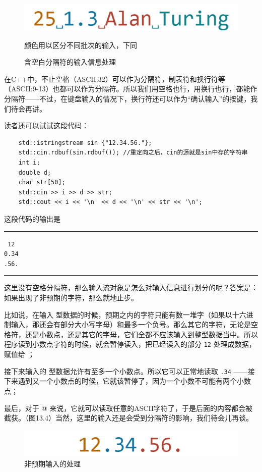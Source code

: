 \begin{figure}[htbp]
    \centering
    \includegraphics[width=.4\textwidth]{../images/generalized_parts/13_input_with_space_delimiter.drawio.png}
    \caption{含空白分隔符的输入信息处理}
    \footnotesize{颜色用以区分不同批次的输入，下同} 
\end{figure}
在C++中，不止空格（ASCII:32）可以作为分隔符，制表符和换行符等（ASCII:9-13）也都可以作为分隔符。所以我们用空格也行，用换行也行，都能作分隔符——不过，在键盘输入的情况下，换行符还可以作为``确认输入''的按键，我们待会再讲。\par
读者还可以试试这段代码：
\begin{lstlisting}
    std::istringstream sin {"12.34.56."};
    std::cin.rdbuf(sin.rdbuf()); //重定向之后，cin的源就是sin中存的字符串
    int i;
    double d;
    char str[50];
    std::cin >> i >> d >> str;
    std::cout << i << '\n' << d << '\n' << str << '\n';
\end{lstlisting}
这段代码的输出是\\\noindent\rule{\linewidth}{.2pt}\texttt{
12\\
0.34\\
.56.
}\\\noindent\rule{\linewidth}{.2pt}\par
这里没有空格分隔符，那么输入流对象是怎么对输入信息进行划分的呢？答案是：如果出现了非预期的字符，那么就地止步。\par
比如说，在输入 \lstinline@int@ 型数据的时候，预期之内的字符只能有数一堆字（如果以十六进制输入，那还会有部分大小写字母）和最多一个负号。那么其它的字符，无论是空格符，还是小数点，还是其它的字母，它们全都不应该输入到整型数据当中。所以程序读到小数点字符的时候，就会暂停读入，把已经读入的部分 \texttt{12} 处理成数据，赋值给 \lstinline@i@；\par
接下来输入的 \lstinline@double@ 型数据允许有至多一个小数点。所以它可以正常地读取 \texttt{.34} ——接下来遇到又一个小数点的时候，它就该暂停了，因为一个小数不可能有两个小数点；\par
最后，对于 \lstinline@char[50]@ 来说，它就可以读取任意的ASCII字符了，于是后面的内容都会被 \lstinline@str@ 截获。（图13.4）当然，这里的输入还是会受到分隔符的影响，我们待会儿再谈。\par
\begin{figure}[htbp]
    \centering
    \includegraphics[width=.4\textwidth]{../images/generalized_parts/13_input_without_delimiter.drawio.png}
    \caption{非预期输入的处理}
\end{figure}

